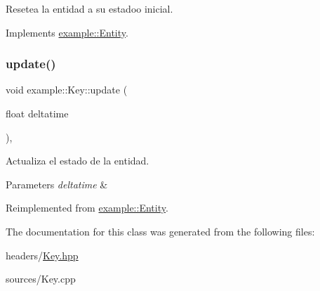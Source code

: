 Resetea la entidad a su estadoo inicial. 



Implements \mbox{\hyperlink{classexample_1_1_entity_a38eec21167e85013a5e89a9131458bfa}{example\+::\+Entity}}.

\mbox{\label{classexample_1_1_key_ac462e54ccbfec9767a2def808ff6c198}} 
\subsubsection{\texorpdfstring{update()}{update()}}
{\footnotesize\ttfamily void example\+::\+Key\+::update (\begin{DoxyParamCaption}\item[{float}]{deltatime }\end{DoxyParamCaption})\hspace{0.3cm}{\ttfamily [override]}, {\ttfamily [virtual]}}



Actualiza el estado de la entidad. 


\begin{DoxyParams}{Parameters}
{\em deltatime} & \\
\hline
\end{DoxyParams}


Reimplemented from \mbox{\hyperlink{classexample_1_1_entity_a1f987399c6c2f5e83b2d245d81cc3b7e}{example\+::\+Entity}}.



The documentation for this class was generated from the following files\+:\begin{DoxyCompactItemize}
\item 
headers/\mbox{\hyperlink{_key_8hpp}{Key.\+hpp}}\item 
sources/Key.\+cpp\end{DoxyCompactItemize}
